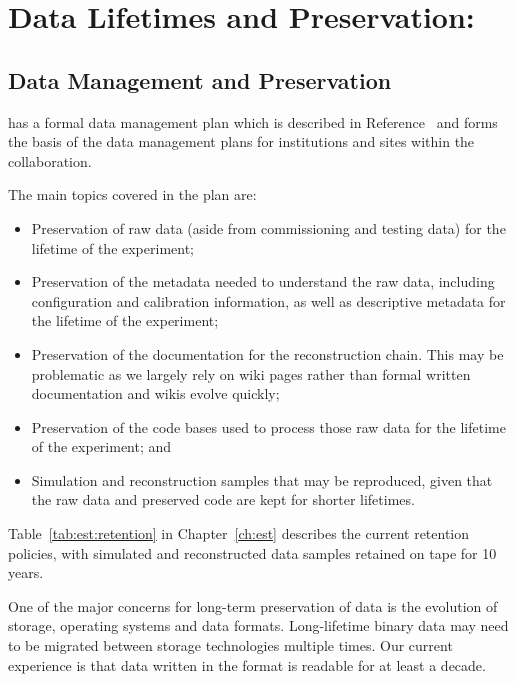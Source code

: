 \documentclass[../main-v1.tex]{subfiles}
\begin{document}
\chapter{Data Lifetimes and Preservation: }
\label{ch:pres}

\section{Data Management and Preservation}
 has a formal data management plan which is described in %
Reference~\cite{bib:docdb5759} and forms the basis of the data management plans for institutions and sites within the collaboration.

The main %
topics covered in the plan are:

\begin{itemize} \item Preservation of raw data (aside from commissioning and testing data) for the lifetime of the experiment;
\item  Preservation of the metadata needed to understand the raw data, including configuration and calibration information, as well as descriptive metadata for the lifetime of the experiment;
\item Preservation of the documentation for the reconstruction chain.  This may be problematic as we largely rely on wiki pages rather than formal written documentation and wikis evolve quickly; 
\item Preservation of the code bases used to process those raw data for the lifetime of the experiment; and
\item Simulation and reconstruction samples that may be reproduced, given that the raw data and preserved code are kept for shorter lifetimes. 
\end{itemize}

Table~\ref{tab:est:retention} in Chapter~\ref{ch:est} describes the current retention policies, with simulated and reconstructed data samples retained on tape for 10 years. 

One of the major concerns for long-term preservation of data is the evolution of storage,  operating systems and data formats. Long-lifetime binary data may need to be migrated between storage technologies multiple times.   Our current experience is that data written in the  format is readable for at least a decade.   
\end{document}

